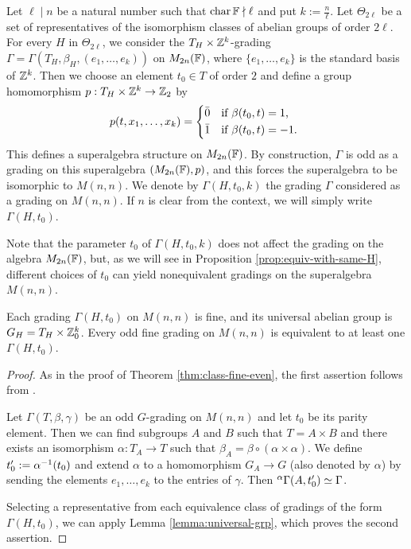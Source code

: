 \begin{defi}\label{def:param-fine-odd}
	Let $\ell\mid n$ be a natural number such that $\operatorname{char} \mathbb{F}\nmid\ell$ and put $k:= \frac{n}{\ell}$.
	Let $\Theta_{2\ell}$ be a set of representatives of the isomorphism classes of abelian groups of order $2\ell$.
	For every $H$ in $\Theta_{2\ell}$, we consider the $T_H\times \mathbb{Z}^k$-grading $\Gamma = \Gamma(T_H, \beta_H, (e_1, \ldots, e_k))$ on $M_{2n}(\mathbb{F})$,
	where $\{e_1, \ldots, e_k\}$ is the standard basis of $\mathbb{Z}^k$.
	Then we choose an element $t_0 \in T$ of order $2$ and define a group homomorphism $p: T_H\times\mathbb{Z}^k \to \mathbb{Z}_2$ by
	\[
	p(t, x_1, \ldots, x_k) =
	\begin{cases*}
		\bar 0 & if $\beta(t_0, t) = 1$,\\
		\bar 1 & if $\beta(t_0, t) = -1$.
	\end{cases*}
	\]
	This defines a superalgebra structure on $M_{2n}(\mathbb{F})$. By construction, $\Gamma$ is odd as a grading on this superalgebra $(M_{2n}(\mathbb{F}),p)$, 
	and this forces the superalgebra to be isomorphic to $M(n,n)$. We denote by $\Gamma(H, t_0, k)$ the grading $\Gamma$ considered as a grading on $M(n,n)$. 
	If $n$ is clear from the context, we will simply write $\Gamma(H, t_0)$.
\end{defi}

Note that the parameter $t_0$ of $\Gamma(H, t_0, k)$ does not affect the grading on the algebra $M_{2n}(\mathbb{F})$, but, as we will see in Proposition \ref{prop:equiv-with-same-H}, different choices of $t_0$ can yield nonequivalent gradings on the superalgebra $M(n,n)$.

\begin{prop}\label{prop:all-fine-odd}
	Each grading $\Gamma(H, t_0)$ on $M(n,n)$ is fine, and its universal abelian group is $G_H = T_H\times \mathbb{Z}^k_0$. 
	Every odd fine grading on $M(n,n)$ is equivalent to at least one $\Gamma(H, t_0)$. 
\end{prop}

\begin{proof}
	As in the proof of Theorem \ref{thm:class-fine-even}, the first assertion follows from \cite[Proposition 2.35]{livromicha}. 
	
	Let $\Gamma(T,\beta, \gamma)$ be an odd $G$-grading on $M(n,n)$ and let $t_0$ be its parity element. 
	Then we can find subgroups $A$ and $B$ such that $T=A\times B$ and there exists an isomorphism $\alpha: T_A \to T$ such that $\beta_A=\beta\circ(\alpha\times\alpha)$. We define $t_0' := \alpha^{-1}(t_0)$ and extend $\alpha$ to a homomorphism $G_A \to G$ (also denoted by $\alpha$)
	by sending the elements $e_1, \ldots, e_k$ to the entries of $\gamma$. Then ${}^\alpha \Gamma(A, t_0') \simeq \Gamma$.
	
	Selecting a representative from each equivalence class of gradings of the form $\Gamma(H, t_0)$, we can apply Lemma \ref{lemma:universal-grp}, 
	which proves the second assertion.
\end{proof}

